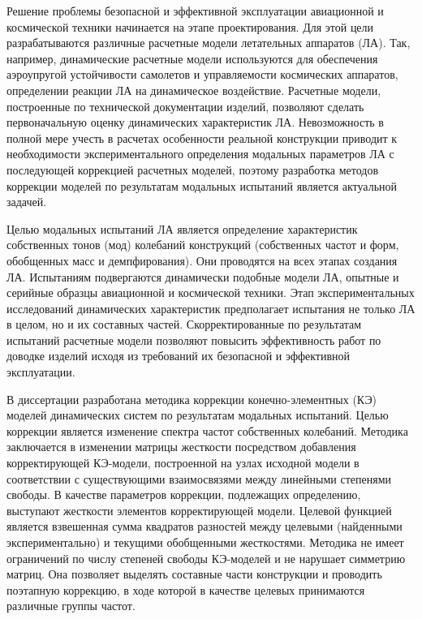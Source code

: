 
{\actuality} 

Решение проблемы безопасной и эффективной эксплуатации авиационной и космической техники начинается на этапе проектирования. Для этой цели разрабатываются различные расчетные модели летательных аппаратов (ЛА). Так, например, динамические расчетные модели используются для обеспечения аэроупругой устойчивости самолетов и управляемости космических аппаратов, определении реакции ЛА на динамическое воздействие. Расчетные модели, построенные по технической документации изделий, позволяют сделать первоначальную оценку динамических характеристик ЛА. Невозможность в полной мере учесть в расчетах особенности реальной конструкции приводит к необходимости экспериментального определения модальных параметров ЛА с последующей коррекцией расчетных моделей, поэтому разработка методов коррекции моделей по результатам модальных испытаний является актуальной задачей.

Целью модальных испытаний ЛА является определение характеристик собственных тонов (мод) колебаний конструкций (собственных частот и форм, обобщенных масс и демпфирования). Они проводятся на всех этапах создания ЛА. Испытаниям подвергаются динамически подобные модели ЛА, опытные и серийные образцы авиационной и космической техники. Этап экспериментальных исследований динамических характеристик предполагает испытания не только ЛА в целом, но и их составных частей. Скорректированные по результатам испытаний расчетные модели позволяют повысить эффективность работ по доводке изделий исходя из требований их безопасной и эффективной эксплуатации. 

В диссертации разработана методика коррекции конечно-элементных (КЭ) моделей динамических систем по результатам модальных испытаний. Целью коррекции является изменение спектра частот собственных колебаний. Методика заключается в изменении матрицы жесткости посредством добавления корректирующей КЭ-модели, построенной на узлах исходной модели в соответствии с существующими взаимосвязями между линейными степенями свободы. В качестве параметров коррекции, подлежащих определению, выступают жесткости элементов корректирующей модели. Целевой функцией является взвешенная сумма квадратов разностей между целевыми (найденными экспериментально) и текущими обобщенными жесткостями. Методика не имеет ограничений по числу степеней свободы КЭ-моделей и не нарушает симметрию матриц. Она позволяет выделять составные части конструкции и проводить поэтапную коррекцию, в ходе которой в качестве целевых принимаются различные группы частот.

